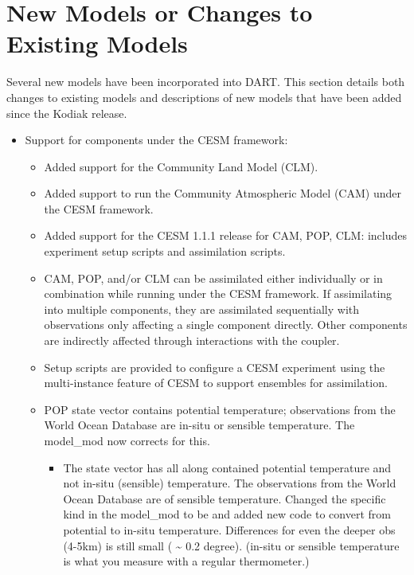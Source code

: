 \documentclass[letterpaper,10pt,english]{sphinxmanual}
\begin{document}
\section{New Models or Changes to Existing Models}
\label{docs/Lanai_diffs_from_Kodiak:new-models-or-changes-to-existing-models}
Several new models have been incorporated into DART. This section
details both changes to existing models and descriptions of new models
that have been added since the Kodiak release.
\begin{itemize}
\item {} 
Support for components under the CESM framework:
\begin{itemize}
\item {} 
Added support for the Community Land Model (CLM).

\item {} 
Added support to run the Community Atmospheric Model (CAM) under
the CESM framework.

\item {} 
Added support for the CESM 1.1.1 release for CAM, POP, CLM:
includes experiment setup scripts and assimilation scripts.

\item {} 
CAM, POP, and/or CLM can be assimilated either individually or
in combination while running under the CESM framework. If
assimilating into multiple components, they are assimilated
sequentially with observations only affecting a single component
directly. Other components are indirectly affected through
interactions with the coupler.

\item {} 
Setup scripts are provided to configure a CESM experiment using
the multi-instance feature of CESM to support ensembles for
assimilation.

\item {} 
POP state vector contains potential temperature; observations
from the World Ocean Database are in-situ or sensible
temperature. The model\_mod now corrects for this.
\begin{itemize}
\item {} 
The state vector has all along contained potential
temperature and not in-situ (sensible) temperature. The
observations from the World Ocean Database are of sensible
temperature. Changed the specific kind in the model\_mod to
be  and added new code to convert
from potential to in-situ temperature. Differences for even
the deeper obs (4-5km) is still small ( \textasciitilde{} 0.2 degree).
(in-situ or sensible temperature is what you measure with a
regular thermometer.)


\end{itemize}
\end{itemize}
\end{itemize}
\end{document}
